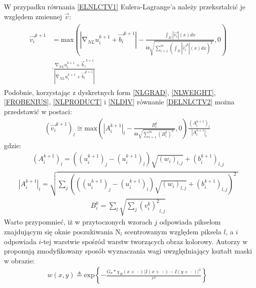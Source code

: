 \documentclass[12pt, twoside, openany]{report}
\theoremstyle{definition}
\begin{document}
W przypadku równania \eqref{ELNLCTV1} Eulera-Lagrange’a należy przekształcić je względem zmiennej $\overrightarrow{v}$:
\begin{align}
\begin{aligned}
{\overrightarrow{v_i}}^{k+1} &= \mathrm{max} \left(\left|{\mathrm{\nabla }}_{NL}u^{k+1}_i+{\overrightarrow{b_i}}^{k+1}\right|-\frac{\int_D{\left|\overrightarrow{v_i}\right|(x)}dx}{\mathrm{\Theta }\sqrt{\sum^m_{i=1}{{\left(\int_D{\left|{\overrightarrow{v_i}}^k\right|(x)}dx\right)}^2}\ }},0\right) \\ 
&\cdot \frac{{\mathrm{\nabla }}_{NL}u^{k+1}_i+{{\overrightarrow{b}}_i}^{k+1}}{\left|{\mathrm{\nabla }}_{NL}u^{k+1}_i+{\overrightarrow{b_i}}^{k+1}\right|}\ 
\label{DELNLCTV2}
\end{aligned}
\end{align}
Podobnie, korzystając z dyskretnych form \eqref{NLGRAD}, \eqref{NLWEIGHT}, \eqref{FROBENIUS}, \eqref{NLPRODUCT} i \eqref{NLDIV} równanie \eqref{DELNLCTV2} można przedstawić w postaci:
\begin{align}
{\left({\overrightarrow{v_i}}^{k+1}\right)}_l\cong {\mathrm{max} \left({\left|A^{k+1}_i\right|}_l-\frac{B^k_i}{\mathrm{\Theta }\sqrt{\sum^m_{i=1}{{\left(B^k_i\right)}^2}\ }},0\right)\frac{{\left(A^{k+1}_i\right)}_l}{{\left|A^{k+1}_i\right|}_l}\ }
\label{VNLCTVITER}
\end{align}
gdzie:
\begin{align}
{\left(A^{k+1}_i\right)}_l=\left({\left(u^{k+1}_i\right)}_j-{\left(u^{k+1}_i\right)}_l\right)\sqrt{{\left(w_i\right)}_{l,j}}+{\left(b^{k+1}_i\right)}_{l,j}
\end{align} 
\begin{align}
{\left|A^{k+1}_i\right|}_l=\sqrt{\sum_j{{\left(\left({\left(u^{k+1}_i\right)}_j-{\left(u^{k+1}_i\right)}_l\right)\sqrt{{\left(w_i\right)}_{l,j}}+{\left(b^{k+1}_i\right)}_{l,j}\right)}^2}\ }
\end{align}
\begin{align}
B^k_i=\sum_l{\sqrt{\sum_j{{{\left(v^k_i\right)}^2}_{l,j}}}}
\end{align}
Warto przypomnieć, iż w przytoczonych wzorach $j$ odpowiada pikselom znajdującym się oknie poszukiwania ${\mathrm{N}}_l$ scentrowanym względem piksela $l$, a $i$ odpowiada $i$-tej warstwie spośród warstw tworzących obraz kolorowy. Autorzy w \cite{jung2011nonlocal} proponują zmodyfikowany sposób wyznaczania wagi uwzględniający kształt maski w obrazie:
\begin{align}
w\left(x,y\right)\triangleq {\mathrm{exp} \left\{-\frac{G_{\sigma }*{\chi }_R\left(x+\ \cdot \right){\left|I\left(x+\ \cdot \right)-I\left(y+\ \cdot \right)\right|}^2}{r^2}\right\}\ }
\label{NLWEIGHTMASK}
\end{align}
\end{document}
